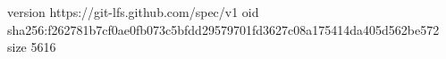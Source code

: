 version https://git-lfs.github.com/spec/v1
oid sha256:f262781b7cf0ae0fb073c5bfdd29579701fd3627c08a175414da405d562be572
size 5616
